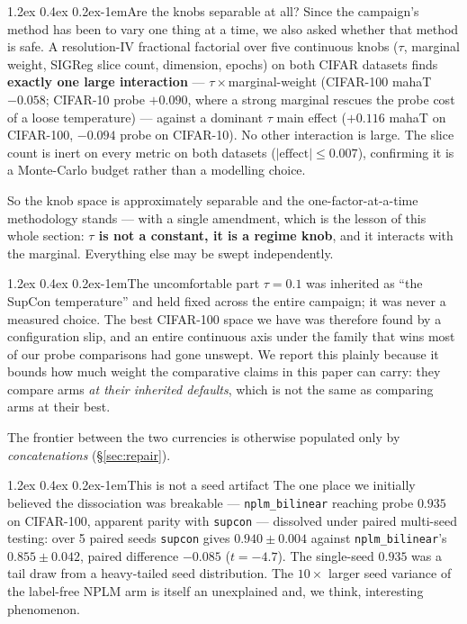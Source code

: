 \documentclass{article}
\makeatletter
\renewcommand\paragraph{\@startsection{paragraph}{4}{\z@}%
  {1.2ex \@plus 0.4ex \@minus 0.2ex}{-1em}{\normalsize\bf}}
\makeatother
\begin{document}
\paragraph{Are the knobs separable at all?}
Since the campaign's method has been to vary one thing at a time, we also asked
whether that method is safe. A resolution-IV fractional factorial over five
continuous knobs ($\tau$, marginal weight, SIGReg slice count, dimension,
epochs) on both CIFAR datasets finds \textbf{exactly one large interaction} ---
$\tau\times$marginal-weight (CIFAR-100 mahaT $-0.058$; CIFAR-10 probe $+0.090$,
where a strong marginal rescues the probe cost of a loose temperature) ---
against a dominant $\tau$ main effect ($+0.116$ mahaT on CIFAR-100, $-0.094$
probe on CIFAR-10). No other interaction is large. The slice count is inert on
every metric on both datasets ($|\text{effect}|\le0.007$), confirming it is a
Monte-Carlo budget rather than a modelling choice.

So the knob space is approximately separable and the one-factor-at-a-time
methodology stands --- with a single amendment, which is the lesson of this
whole section: \textbf{$\tau$ is not a constant, it is a regime knob}, and it
interacts with the marginal. Everything else may be swept independently.

\paragraph{The uncomfortable part}
$\tau=0.1$ was inherited as ``the SupCon temperature'' and held fixed across
the entire campaign; it was never a measured choice. The best CIFAR-100 space
we have was therefore found by a configuration slip, and an entire continuous
axis under the family that wins most of our probe comparisons had gone
unswept. We report this plainly because it bounds how much weight the
comparative claims in this paper can carry: they compare arms \emph{at their
inherited defaults}, which is not the same as comparing arms at their best.

The frontier between the two currencies is otherwise populated only by
\emph{concatenations} (\S\ref{sec:repair}).

\paragraph{This is not a seed artifact}
The one place we initially believed the dissociation was breakable ---
\texttt{nplm\_bilinear} reaching probe $0.935$ on CIFAR-100, apparent parity
with \texttt{supcon} --- dissolved under paired multi-seed testing: over 5
paired seeds \texttt{supcon} gives $0.940\pm0.004$ against
\texttt{nplm\_bilinear}'s $0.855\pm0.042$, paired difference $-0.085$
($t=-4.7$). The single-seed $0.935$ was a tail draw from a heavy-tailed seed
distribution. The $10\times$ larger seed variance of the label-free NPLM arm is
itself an unexplained and, we think, interesting phenomenon.
\end{document}
